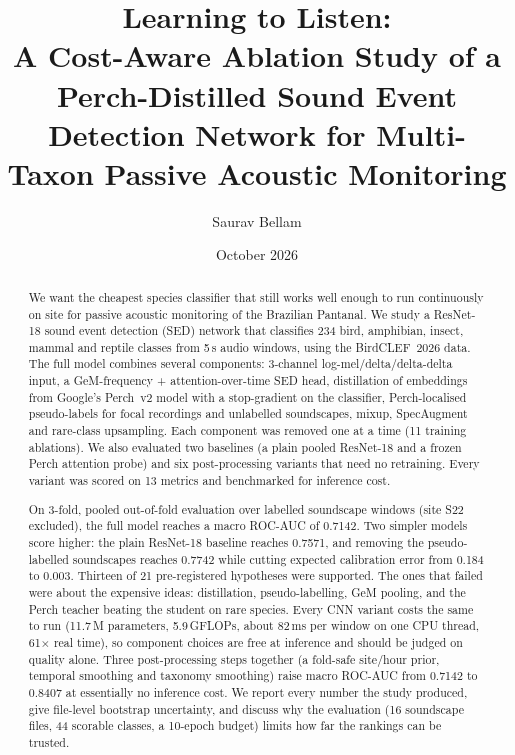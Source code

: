 \documentclass[11pt]{article}
\title{\textbf{Learning to Listen:}\\[4pt]
A Cost-Aware Ablation Study of a Perch-Distilled Sound Event Detection Network
for Multi-Taxon Passive Acoustic Monitoring}
\author{Saurav Bellam}
\date{October 2026}
\begin{document}
\maketitle

\begin{abstract}
We want the cheapest species classifier that still works well enough to run
continuously on site for passive acoustic monitoring of the Brazilian
Pantanal. We study a ResNet-18 sound event detection (SED) network that
classifies 234 bird, amphibian, insect, mammal and reptile classes from 5\,s
audio windows, using the BirdCLEF~2026 data. The full model combines several
components: 3-channel log-mel/delta/delta-delta input, a GeM-frequency +
attention-over-time SED head, distillation of embeddings from Google's Perch~v2
model with a stop-gradient on the classifier, Perch-localised pseudo-labels for
focal recordings and unlabelled soundscapes, mixup, SpecAugment and rare-class
upsampling. Each component was removed one at a time (11 training ablations).
We also evaluated two baselines (a plain pooled ResNet-18 and a frozen Perch
attention probe) and six post-processing variants that need no retraining.
Every variant was scored on 13 metrics and benchmarked for inference cost.

On 3-fold, pooled out-of-fold evaluation over labelled soundscape windows (site
S22 excluded), the full model reaches a macro ROC-AUC of 0.7142. Two simpler
models score higher: the plain ResNet-18 baseline reaches 0.7571, and removing
the pseudo-labelled soundscapes reaches 0.7742 while cutting expected
calibration error from 0.184 to 0.003. Thirteen of 21 pre-registered hypotheses
were supported. The ones that failed were about the expensive ideas:
distillation, pseudo-labelling, GeM pooling, and the Perch teacher beating the
student on rare species. Every CNN variant costs the same to run (11.7\,M
parameters, 5.9\,GFLOPs, about 82\,ms per window on one CPU thread, 61$\times$
real time), so component choices are free at inference and should be judged on
quality alone. Three post-processing steps together (a fold-safe site/hour
prior, temporal smoothing and taxonomy smoothing) raise macro ROC-AUC from
0.7142 to 0.8407 at essentially no inference cost. We report every number the
study produced, give file-level bootstrap uncertainty, and discuss why the
evaluation (16 soundscape files, 44 scorable classes, a 10-epoch budget)
limits how far the rankings can be trusted.
\end{abstract}
\end{document}
